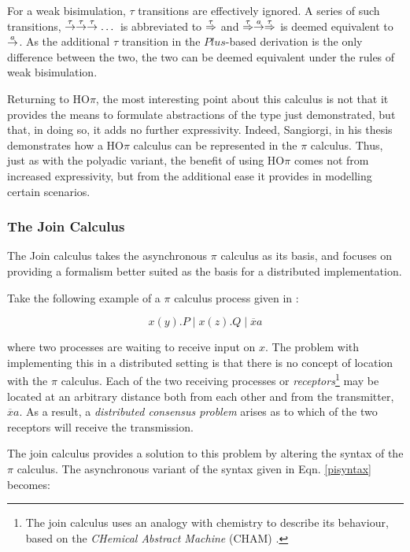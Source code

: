 For a weak bisimulation, $\tau$ transitions are effectively ignored.
A series of such transitions,
$\stackrel{\tau}{\rightarrow}\stackrel{\tau}{\rightarrow}\stackrel{\tau}{\rightarrow}\dots$ is abbreviated to
$\stackrel{\tau}{\Rightarrow}$ and $\stackrel{\tau}{\Rightarrow} \stackrel{a}{\rightarrow}
\stackrel{\tau}{\Rightarrow}$ is deemed equivalent to $\stackrel{a}{\rightarrow}$.  As the
additional $\tau$ transition in the $Plus$-based derivation is the
only difference between the two, the two can be deemed equivalent
under the rules of weak bisimulation.

Returning to HO$\pi$, the most interesting point about this calculus
is not that it provides the means to formulate abstractions of the
type just demonstrated, but that, in doing so, it adds no further
expressivity.  Indeed, Sangiorgi, in his thesis \cite{sangiorgi:phd}
demonstrates how a HO$\pi$ calculus can be represented in the $\pi$
calculus.  Thus, just as with the polyadic variant, the benefit of
using HO$\pi$ comes not from increased expressivity, but from the
additional ease it provides in modelling certain scenarios.

\subsubsection{The Join Calculus}
\label{join}

The Join calculus \cite*{join} takes the asynchronous $\pi$ calculus as
its basis, and focuses on providing a formalism better suited as the
basis for a distributed implementation.

Take the following example of a $\pi$ calculus process given in
\cite{joinresults}:

\begin{equation}
x(y).P\;|\;x(z).Q\;|\;\overline{x}a
\end{equation}

\noindent where two processes are waiting to receive input on $x$.
The problem with implementing this in a distributed setting is that
there is no concept of location with the $\pi$ calculus.  Each of the
two receiving processes or \emph{receptors}\footnote{The join calculus
  uses an analogy with chemistry to describe its behaviour, based on
  the \emph{CHemical Abstract Machine} (CHAM) \cite*{cham}.} may be
located at an arbitrary distance both from each other and from the
transmitter, $\overline{x}a$.  As a result, a \emph{distributed
  consensus problem} arises as to which of the two receptors will
receive the transmission.

The join calculus provides a solution to this problem by altering the
syntax of the $\pi$ calculus.  The asynchronous variant of the
syntax given in Eqn. \ref{pisyntax} becomes:

